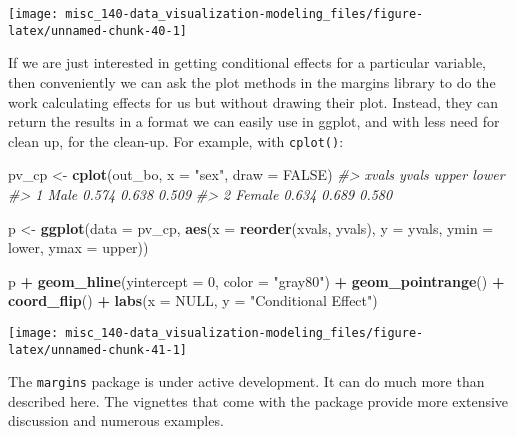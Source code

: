 \documentclass[]{book}
\newenvironment{Shaded}{\begin{snugshade}}{\end{snugshade}}
\newcommand{\CommentTok}[1]{\textcolor[rgb]{0.56,0.35,0.01}{\textit{#1}}}
\newcommand{\DataTypeTok}[1]{\textcolor[rgb]{0.13,0.29,0.53}{#1}}
\newcommand{\DecValTok}[1]{\textcolor[rgb]{0.00,0.00,0.81}{#1}}
\newcommand{\KeywordTok}[1]{\textcolor[rgb]{0.13,0.29,0.53}{\textbf{#1}}}
\newcommand{\NormalTok}[1]{#1}
\newcommand{\OperatorTok}[1]{\textcolor[rgb]{0.81,0.36,0.00}{\textbf{#1}}}
\newcommand{\OtherTok}[1]{\textcolor[rgb]{0.56,0.35,0.01}{#1}}
\newcommand{\StringTok}[1]{\textcolor[rgb]{0.31,0.60,0.02}{#1}}
\begin{document}
\begin{center}\texttt{[image: misc\_140-data\_visualization-modeling\_files/figure-latex/unnamed-chunk-40-1]} \end{center}

If we are just interested in getting conditional effects for a particular variable, then conveniently we can ask the plot methods in the margins library to do the work calculating effects for us but without drawing their plot. Instead, they can return the results in a format we can easily use in ggplot, and with less need for clean up, for the clean-up. For example, with \texttt{cplot()}:

\begin{Shaded}
\begin{Highlighting}[]
\NormalTok{pv_cp <-}\StringTok{ }\KeywordTok{cplot}\NormalTok{(out_bo, }\DataTypeTok{x =} \StringTok{"sex"}\NormalTok{, }\DataTypeTok{draw =} \OtherTok{FALSE}\NormalTok{)}
\CommentTok{#>    xvals yvals upper lower}
\CommentTok{#> 1   Male 0.574 0.638 0.509}
\CommentTok{#> 2 Female 0.634 0.689 0.580}

\NormalTok{p <-}\StringTok{ }\KeywordTok{ggplot}\NormalTok{(}\DataTypeTok{data =}\NormalTok{ pv_cp, }\KeywordTok{aes}\NormalTok{(}\DataTypeTok{x =} \KeywordTok{reorder}\NormalTok{(xvals, yvals),}
                              \DataTypeTok{y =}\NormalTok{ yvals, }\DataTypeTok{ymin =}\NormalTok{ lower, }\DataTypeTok{ymax =}\NormalTok{ upper))}

\NormalTok{p }\OperatorTok{+}\StringTok{ }\KeywordTok{geom_hline}\NormalTok{(}\DataTypeTok{yintercept =} \DecValTok{0}\NormalTok{, }\DataTypeTok{color =} \StringTok{"gray80"}\NormalTok{) }\OperatorTok{+}
\StringTok{    }\KeywordTok{geom_pointrange}\NormalTok{() }\OperatorTok{+}\StringTok{ }\KeywordTok{coord_flip}\NormalTok{() }\OperatorTok{+}
\StringTok{    }\KeywordTok{labs}\NormalTok{(}\DataTypeTok{x =} \OtherTok{NULL}\NormalTok{, }\DataTypeTok{y =} \StringTok{"Conditional Effect"}\NormalTok{) }
\end{Highlighting}
\end{Shaded}

\begin{center}\texttt{[image: misc\_140-data\_visualization-modeling\_files/figure-latex/unnamed-chunk-41-1]} \end{center}

The \texttt{margins} package is under active development. It can do much more than described here. The vignettes that come with the package provide more extensive discussion and numerous examples.
\end{document}
